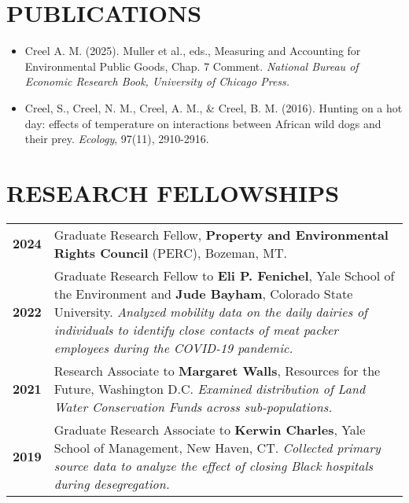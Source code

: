 \documentclass[11pt]{article}
\begin{document}
\section*{PUBLICATIONS}

\begin{itemize}[left=0pt, label={}, align=left, itemsep=0pt, parsep=0pt]
    \setlength{\itemindent}{-1em}
    \setlength{\leftskip}{1em}
    \setlength{\parindent}{-1em}
    \item Creel A. M. (2025). Muller et al., eds., Measuring and Accounting for Environmental Public Goods, Chap. 7 Comment. \textit{National Bureau of Economic Research Book, University of Chicago Press.}
    \item Creel, S., Creel, N. M., Creel, A. M., \& Creel, B. M. (2016). Hunting on a hot day: effects of temperature on interactions between African wild dogs and their prey. \textit{Ecology}, 97(11), 2910-2916.
\end{itemize}



\section*{RESEARCH FELLOWSHIPS}
\begin{longtable}{>{\bfseries}r p{5.5in}} %
2024 & Graduate Research Fellow, \textbf{Property and Environmental Rights Council} (PERC), Bozeman, MT. \\
2022 & Graduate Research Fellow to \textbf{Eli P. Fenichel}, Yale School of the Environment and \textbf{Jude Bayham}, Colorado State University. \textit{Analyzed mobility data on the daily dairies of individuals to identify close contacts of meat packer employees during the COVID-19 pandemic.} \\
2021 & Research Associate to \textbf{Margaret Walls}, Resources for the Future, Washington D.C. \textit{Examined distribution of Land Water Conservation Funds across sub-populations.}\\
2019 & Graduate Research Associate to \textbf{Kerwin Charles}, Yale School of Management, New Haven, CT. \textit{Collected primary source data to analyze the effect of closing Black hospitals during desegregation.} \\
\end{longtable}
\end{document}
